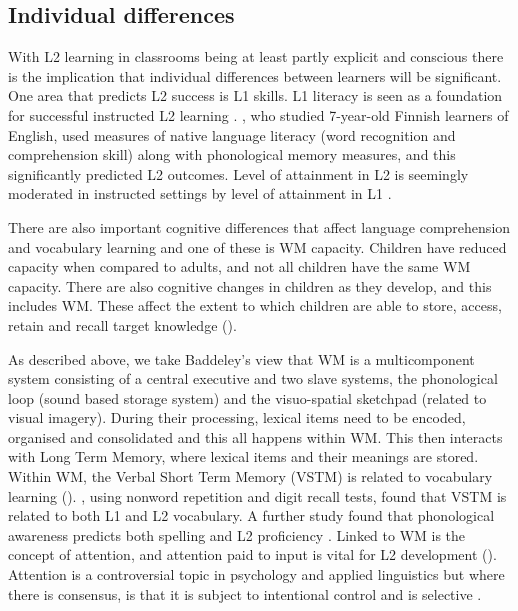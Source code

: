 \documentclass[output=paper]{langscibook}
\begin{document}
\subsection{Individual differences}

With L2 learning in classrooms being at least partly explicit and conscious there is the implication that individual differences between learners will be significant. One area that predicts L2 success is L1 skills. L1 literacy is seen as a foundation for successful instructed L2 learning \citep{SparksEtAl2006}. \citet{DufvaVoeten2001}, who studied 7-year-old Finnish learners of English, used measures of native language literacy (word recognition and comprehension skill) along with phonological memory measures, and this significantly predicted L2 outcomes. Level of attainment in L2 is seemingly moderated in instructed settings by level of attainment in L1 \citep{Sparks2012}.

There are also important cognitive differences that affect language comprehension and vocabulary learning and one of these is WM capacity. Children have reduced capacity when compared to adults, and not all children have the same WM capacity. There are also cognitive changes in children as they develop, and this includes WM. These affect the extent to which children are able to store, access, retain and recall target knowledge (\citealt[4]{KasprowiczEtAl2019}).

As described above, we take Baddeley’s view that WM is a multicomponent system consisting of a central executive and two slave systems, the phonological loop (sound based storage system) and the visuo-spatial sketchpad (related to visual imagery). During their processing, lexical items need to be encoded, organised and consolidated and this all happens within WM. This then interacts with Long Term Memory, where lexical items and their meanings are stored. Within WM, the Verbal Short Term Memory (VSTM) is related to vocabulary learning (\citealt{GathercoleEtAl1992,VerhagenLeseman2016}). \citet{EngeldeAbreuGathercole2012}, using nonword repetition and digit recall tests, found that VSTM is related to both L1 and L2 vocabulary. A further study found that phonological awareness predicts both spelling and L2 proficiency \citep{Sparks2012}. Linked to WM is the concept of attention, and attention paid to input is vital for L2 development (\citealt{IndrarathneKormos2018}). Attention is a controversial topic in psychology and applied linguistics but where there is consensus, is that it is subject to intentional control and is selective \citep[212]{Kormos2020}.
\end{document}
